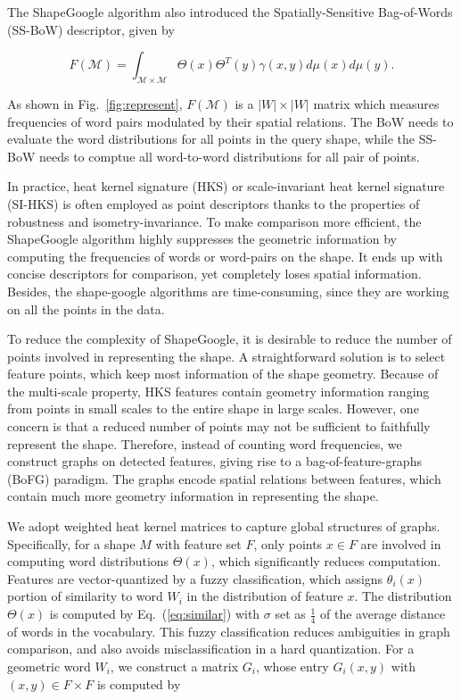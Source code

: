 The ShapeGoogle algorithm also introduced the Spatially-Sensitive Bag-of-Words (SS-BoW)
descriptor, given by

\begin{equation}
F(\mathcal{M})=\int_{\mathcal{M}\times\mathcal{M}}\Theta(x)\Theta^T(y)\gamma(x,y)d\mu(x)d\mu(y).
\end{equation}

As shown in Fig.~\ref{fig:represent}, $F(\mathcal{M})$ is a $|W|\times|W|$ matrix which
measures frequencies of word pairs modulated by their spatial relations. The BoW needs
to evaluate the word distributions for all points in the query shape, while the
SS-BoW needs to comptue all word-to-word distributions for all pair of points.

In practice, heat kernel signature (HKS) or scale-invariant heat kernel signature (SI-HKS) is often
employed as point descriptors thanks to the properties of robustness and isometry-invariance.
To make comparison more efficient, the ShapeGoogle algorithm highly suppresses the geometric
information by computing the frequencies of words or word-pairs on the shape. It ends up with concise descriptors for comparison,
yet completely loses spatial information. Besides, the shape-google algorithms are time-consuming,
since they are working on all the points in the data.

To reduce the complexity of ShapeGoogle, it is desirable to reduce the number of points involved
in representing the shape. A straightforward solution is to select feature points, which keep most
information of the shape geometry. Because of the multi-scale property, HKS features contain geometry
information ranging from points in small scales to the entire shape in large scales. However, one concern
is that a reduced number of points may not be sufficient to faithfully represent the shape. Therefore,
instead of counting word frequencies, we construct graphs on detected features, giving rise to a
bag-of-feature-graphs (BoFG) paradigm. The graphs encode spatial relations between features, which contain
much more geometry information in representing the shape.

We adopt weighted heat kernel matrices to capture global structures of graphs. Specifically, for a shape $M$ with
feature set $F$, only points $x\in F$ are involved in computing word distributions $\Theta(x)$, which significantly reduces
computation. Features are vector-quantized by a fuzzy classification, which assigns $\theta_i(x)$ portion of similarity
to word $W_i$ in the distribution of feature $x$. The distribution $\Theta(x)$ is computed by Eq.~(\ref{eq:similar})
with $\sigma$ set as $\frac{1}{4}$ of the average distance of words in the vocabulary. This fuzzy classification reduces
ambiguities in graph comparison, and also avoids misclassification in a hard quantization. For a geometric word $W_i$, we
construct a matrix $G_i$, whose entry $G_i(x,y)$ with $(x,y)\in F\times F$ is computed by

